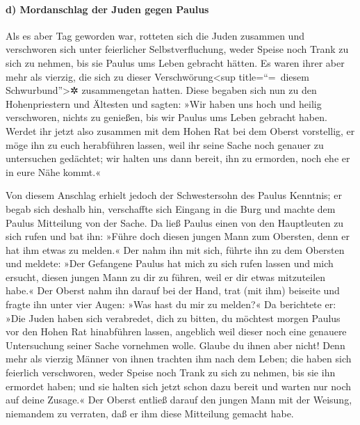 \hypertarget{d-mordanschlag-der-juden-gegen-paulus}{%
\paragraph{d) Mordanschlag der Juden gegen
Paulus}\label{d-mordanschlag-der-juden-gegen-paulus}}

 Als es aber Tag geworden war, rotteten sich die Juden
zusammen und verschworen sich unter feierlicher Selbstverfluchung, weder
Speise noch Trank zu sich zu nehmen, bis sie Paulus ums Leben gebracht
hätten.  Es waren ihrer aber mehr als vierzig, die sich
zu dieser Verschwörung\textless sup title=``=~diesem
Schwurbund''\textgreater✲ zusammengetan hatten.  Diese
begaben sich nun zu den Hohenpriestern und Ältesten und sagten: »Wir
haben uns hoch und heilig verschworen, nichts zu genießen, bis wir
Paulus ums Leben gebracht haben.  Werdet ihr jetzt also
zusammen mit dem Hohen Rat bei dem Oberst vorstellig, er möge ihn zu
euch herabführen lassen, weil ihr seine Sache noch genauer zu
untersuchen gedächtet; wir halten uns dann bereit, ihn zu ermorden, noch
ehe er in eure Nähe kommt.«

 Von diesem Anschlag erhielt jedoch der Schwestersohn des
Paulus Kenntnis; er begab sich deshalb hin, verschaffte sich Eingang in
die Burg und machte dem Paulus Mitteilung von der Sache. 
Da ließ Paulus einen von den Hauptleuten zu sich rufen und bat ihn:
»Führe doch diesen jungen Mann zum Obersten, denn er hat ihm etwas zu
melden.«  Der nahm ihn mit sich, führte ihn zu dem
Obersten und meldete: »Der Gefangene Paulus hat mich zu sich rufen
lassen und mich ersucht, diesen jungen Mann zu dir zu führen, weil er
dir etwas mitzuteilen habe.«  Der Oberst nahm ihn darauf
bei der Hand, trat (mit ihm) beiseite und fragte ihn unter vier Augen:
»Was hast du mir zu melden?«  Da berichtete er: »Die
Juden haben sich verabredet, dich zu bitten, du möchtest morgen Paulus
vor den Hohen Rat hinabführen lassen, angeblich weil dieser noch eine
genauere Untersuchung seiner Sache vornehmen wolle. 
Glaube du ihnen aber nicht! Denn mehr als vierzig Männer von ihnen
trachten ihm nach dem Leben; die haben sich feierlich verschworen, weder
Speise noch Trank zu sich zu nehmen, bis sie ihn ermordet haben; und sie
halten sich jetzt schon dazu bereit und warten nur noch auf deine
Zusage.«  Der Oberst entließ darauf den jungen Mann mit
der Weisung, niemandem zu verraten, daß er ihm diese Mitteilung gemacht
habe.

